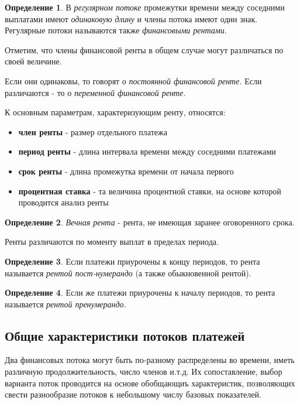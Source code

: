 \documentclass[aps,%
12pt,%
final,%
oneside,
onecolumn,%
musixtex, %
superscriptaddress,%
centertags]{article} %
\theoremstyle{plain}
\theoremstyle{definition}
\newtheorem{definition}{Определение}[subsection]
\theoremstyle{remark}
\begin{document}
\begin{definition}
	В \textit{регулярном потоке} промежутки времени между соседними выплатами имеют \textit{одинаковую длину} и члены потока имеют один знак. Регулярные потоки называются также \textit{финансовыми рентами}.
\end{definition}

Отметим, что члены финансовой ренты в общем случае могут различаться по своей величине. 

Если они одинаковы, то говорят о \textit{постоянной финансовой ренте.} Если различаются - то о \textit{переменной финансовой ренте.} 

К основным параметрам, характеризующим ренту, относятся:
\begin{itemize}
	\item \textbf{член ренты} - размер отдельного платежа
	\item \textbf{период ренты} - длина интервала времени между соседними платежами
	\item \textbf{срок ренты} - длина промежутка времени от начала первого 
	\item \textbf{процентная ставка} - та величина процентной ставки, на основе которой проводится анализ ренты
\end{itemize}

\begin{definition}
	\textit{Вечная рента} - рента, не имеющая заранее оговоренного срока.
\end{definition}

Ренты различаются по моменту выплат в пределах периода. 

\begin{definition}
	Если платежи приурочены к концу периодов, то рента называется \textit{рентой пост-нумерандо} (а также обыкновенной рентой).
\end{definition}
\begin{definition}
	Если же платежи приурочены к началу периодов, то рента называется \textit{рентой пренумерандо.}
\end{definition}

\subsection{Общие характеристики потоков платежей}

Два финансовых потока могут быть по-разному распределены во времени, иметь различную продолжительность, число членов и.т.д. Их сопоставление, выбор варианта поток проводится на основе обобщающиъ характеристик, позволяющих свести разнообразие потоков к небольшому числу базовых показателей.
\end{document}
